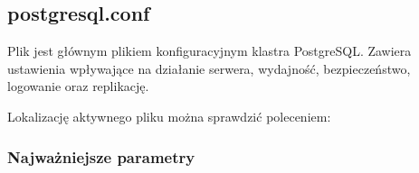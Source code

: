 \documentclass[a4paper,11pt,english,openany,oneside]{sphinxmanual}
\begin{document}
\subsection{postgresql.conf}
\label{\detokenize{rozdzial_2/rozdzial_22/index:postgresql-conf}}
\sphinxAtStartPar
Plik  jest głównym plikiem konfiguracyjnym klastra PostgreSQL.
Zawiera ustawienia wpływające na działanie serwera, wydajność, bezpieczeństwo, logowanie oraz replikację.

\sphinxAtStartPar
Lokalizację aktywnego pliku można sprawdzić poleceniem:

\begin{sphinxVerbatim}[commandchars=\\\{\}]
\end{sphinxVerbatim}


\subsubsection{Najważniejsze parametry}
\label{\detokenize{rozdzial_2/rozdzial_22/index:najwazniejsze-parametry}}
\end{document}
